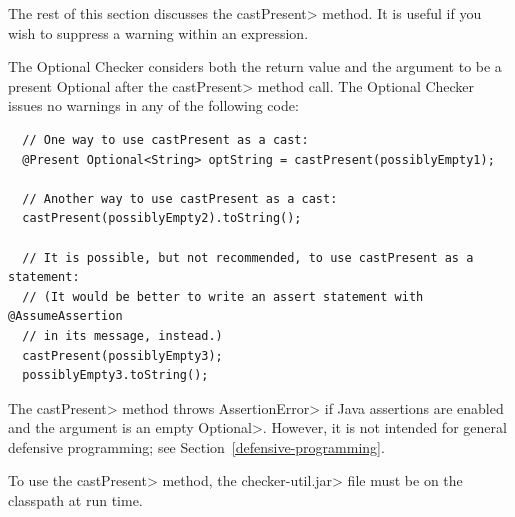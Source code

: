 The rest of this section discusses the \<castPresent> method.
It is useful if you wish to suppress a warning within an expression.

The Optional Checker considers both the return value and the
argument to be a present Optional after the \<castPresent>
method call.
The Optional Checker issues no warnings in any of the following
code:

\begin{Verbatim}
  // One way to use castPresent as a cast:
  @Present Optional<String> optString = castPresent(possiblyEmpty1);

  // Another way to use castPresent as a cast:
  castPresent(possiblyEmpty2).toString();

  // It is possible, but not recommended, to use castPresent as a statement:
  // (It would be better to write an assert statement with @AssumeAssertion
  // in its message, instead.)
  castPresent(possiblyEmpty3);
  possiblyEmpty3.toString();
\end{Verbatim}

  The \<castPresent> method throws \<AssertionError> if Java assertions are
  enabled and the argument is an empty \<Optional>.
  However, it is not intended for general defensive programming; see
  Section~\ref{defensive-programming}.

  To use the \<castPresent> method, the \<checker-util.jar> file
  must be on the classpath at run time.

